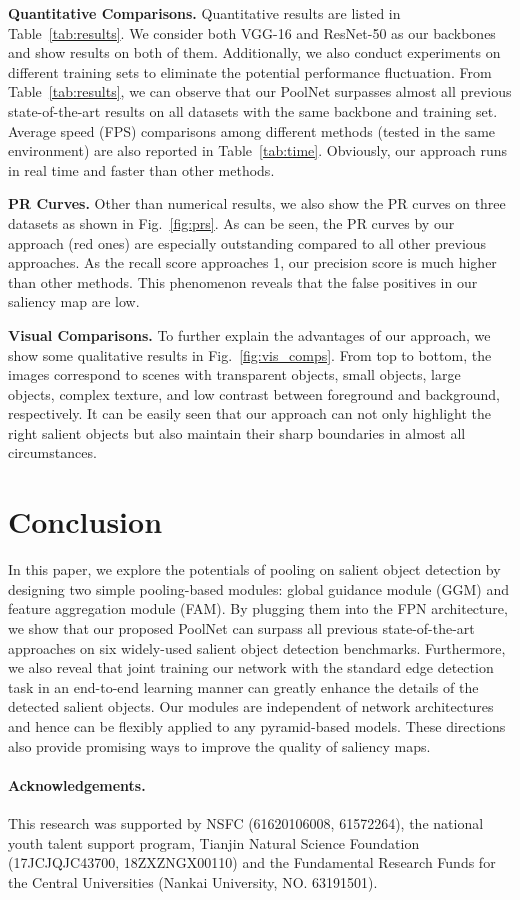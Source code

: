 \documentclass[10pt,twocolumn,letterpaper]{article}
\newcommand{\figref}[1]{Fig.~\ref{#1}}
\newcommand{\tabref}[1]{Table~\ref{#1}}
\newcommand{\myPara}[1]{\vspace{.05in}\noindent\textbf{#1.}}
\begin{document}
\myPara{Quantitative Comparisons}
Quantitative results are listed in \tabref{tab:results}.
We consider both VGG-16 \cite{simonyan2014very} and 
ResNet-50 \cite{He2016} as 
our backbones and show results on both of them.
Additionally, we also conduct experiments on different training 
sets to eliminate the potential performance fluctuation.
From \tabref{tab:results}, we can observe that our PoolNet 
surpasses almost all previous state-of-the-art results 
on all datasets with the same backbone and training set.
Average speed (FPS) comparisons among different methods 
(tested in the same environment) are also reported in \tabref{tab:time}.
Obviously, our approach runs in real time and faster
than other methods.


\myPara{PR Curves}
Other than numerical results, we also show the PR curves
on three datasets as shown in \figref{fig:prs}.
As can be seen, the PR curves by our approach (red ones) 
are especially outstanding compared to all other previous 
approaches.
As the recall score approaches 1, our precision 
score is much higher than other methods.
This phenomenon reveals that the false positives 
in our saliency map are low.

\myPara{Visual Comparisons}
To further explain the advantages of our approach, we show
some qualitative results in \figref{fig:vis_comps}.
From top to bottom, the images correspond to scenes with 
transparent objects, small objects, large objects, complex texture, and low contrast between foreground and background, respectively.
It can be easily seen that our approach can not only highlight
the right salient objects but also
maintain their sharp boundaries in almost all circumstances.


\section{Conclusion}

In this paper, we explore the potentials of pooling on salient object detection by
designing two simple pooling-based modules: global guidance module (GGM) and feature aggregation module (FAM).
By plugging them into the FPN architecture, we show that our proposed PoolNet can surpass
all previous state-of-the-art approaches on six widely-used salient object detection
benchmarks.
Furthermore, we also reveal that joint training our network with
the standard edge detection task in an end-to-end learning manner can
greatly enhance the details of the detected salient objects.
Our modules are independent of network architectures and hence can be flexibly
applied to any pyramid-based models.
These directions also provide promising ways to improve the quality of
saliency maps. 

\paragraph{Acknowledgements.}
This research was supported by NSFC (61620106008, 61572264), 
the national youth talent support program,
Tianjin Natural Science Foundation (17JCJQJC43700, 18ZXZNGX00110)
and the Fundamental Research Funds for the Central Universities 
(Nankai University, NO. 63191501).


{\small


}
\end{document}
